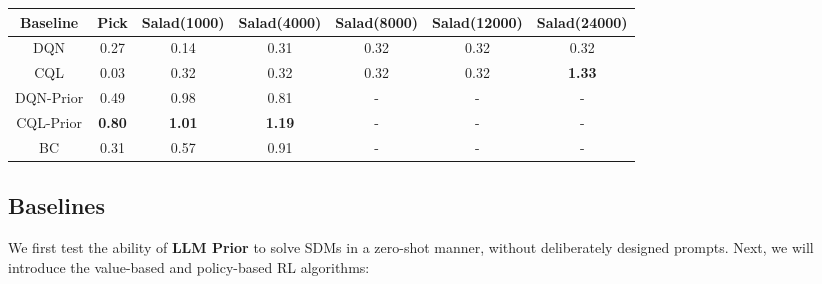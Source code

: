 \documentclass{article} %
\theoremstyle{plain}
\theoremstyle{definition}
\theoremstyle{remark}
\begin{document}
{\begin{table}[]
    \centering
    \begin{tabular}{c|cccccc}
        \hline    
         Baseline& Pick &Salad(1000) &Salad(4000)&Salad(8000)&Salad(12000)&Salad(24000)\\
         \hline
         DQN &0.27&0.14&0.31&0.32&0.32&0.32\\
                  CQL &0.03 &0.32&0.32&0.32&0.32&\textbf{1.33}\\
         DQN-Prior &0.49&0.98&0.81& -&-&-\\
         CQL-Prior &\textbf{0.80}&\textbf{1.01}&\textbf{1.19} &- &-&-\\
         BC &0.31&0.57&0.91&-&-&-\\
         \hline
    \end{tabular}
    \label{tab:offline}
\end{table}








\subsection{Baselines}
We first test the ability of \textbf{LLM Prior} to solve SDMs in a zero-shot manner, without deliberately designed prompts. Next, we will introduce the value-based and policy-based RL algorithms:

}
\end{document}
